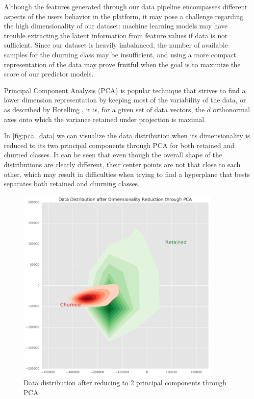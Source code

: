 \documentclass{kththesis}
\begin{document}
Although the features generated through our data pipeline encompasses different aspects of the users behavior in the platform, it may pose a challenge regarding the high dimensionality of our dataset: machine learning models may have trouble extracting the latent information from feature values if data is not sufficient. Since our dataset is heavily imbalanced, the number of available samples for the churning class may be insufficient, and using a more compact representation of the data may prove fruitful when the goal is to maximize the score of our predictor models.

Principal Component Analysis (PCA) is popular technique that strives to find a lower dimension representation by keeping most of the variability of the data, or as described by Hotelling \citep{hotelling1933analysis}, it is, for a given set of data vectors, the $d$ orthonormal axes onto which the variance retained under projection is maximal.

In \autoref{fig:pca_data} we can visualize the data distribution when its dimensionality is reduced to its two principal components through PCA for both retained and churned classes. It can be seen that even though the overall shape of the distributions are clearly different, their center points are not that close to each other, which may result in difficulties when trying to find a hyperplane that bests separates both retained and churning classes.

	\begin{figure}[h]
    \centering
    \includegraphics[width=0.9\textwidth,keepaspectratio]{figures/pca_data.pdf}
    \caption{Data distribution after reducing to 2 principal components through PCA}
    \label{fig:pca_data}
	\end{figure}
\end{document}
